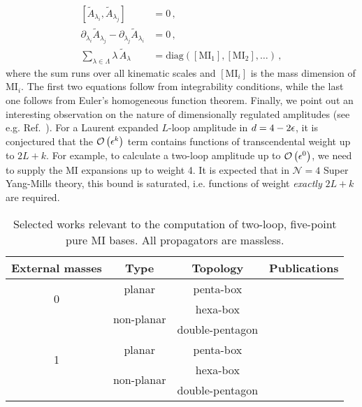 \documentclass[main.tex]{subfiles}
\begin{document}
\begin{subequations}
\begin{align}
    [ \tilde{A}_{\lambda_i}, \tilde{A}_{\lambda_j}] &= 0\,, \\
    \partial_{\lambda_i} \tilde{A}_{\lambda_j} - \partial_{\lambda_j} \tilde{A}_{\lambda_i} &= 0\,, \\
    \sum_{\lambda \in \Lambda} \lambda \, \tilde{A}_\lambda &= \text{diag}([\text{MI}_1], [\text{MI}_2], \ldots)\,,
\end{align}
\end{subequations}
where the sum runs over all kinematic scales and $[\text{MI}_i]$ is the mass dimension of MI$_i$. The first two equations follow from integrability conditions, while the last one follows from Euler's homogeneous function theorem. Finally, we point out an interesting observation on the nature of dimensionally regulated amplitudes (see e.g. Ref.~\cite{Duhr:2014woa}). For a Laurent expanded $L$-loop amplitude in $d = 4- 2\epsilon$, it is conjectured that the $\mathcal{O}\left(\epsilon^k\right)$ term contains functions of transcendental weight up to $2L+k$. For example, to calculate a two-loop amplitude up to $\mathcal{O}\left(\epsilon^0\right)$, we need to supply the MI expansions up to weight 4. It is expected that in $\mathcal{N}=4$ Super Yang-Mills theory, this bound is saturated, i.e. functions of weight \textit{exactly} $2L+k$ are required.
\begin{table}[t]
	\begin{center}
		\begin{tabular}{|c|c|c|c|}
            \hline
            External masses & Type & Topology & Publications \\
			\hline
            \multirow{2}{0cm}{0} & planar & penta-box & \cite{Gehrmann:2015bfy,Papadopoulos:2015jft, Gehrmann:2018yef, Abreu:2018aqd, Chicherin:2020oor} \\
            \cline{2-4}
            & \multirow{2}{2cm}{non-planar} & hexa-box & \cite{Chicherin:2018mue, Chicherin:2017dob, Chicherin:2018ubl, Chicherin:2018wes, Abreu:2018rcw, Chicherin:2020oor, Abreu:2018aqd} \\
            & & double-pentagon & \cite{Chicherin:2018old, Abreu:2018aqd, Chicherin:2020oor} \\
            \hline
            \multirow{2}{0cm}{1} & planar & penta-box & \cite{Papadopoulos:2015jft, Abreu:2020jxa, Chicherin:2021dyp, Canko:2020ylt} \\
            \cline{2-4}
            & \multirow{2}{2cm}{non-planar} & hexa-box & \cite{abreu2021twoloop, Kardos:2022tpo, Papadopoulos:2019iam, Chicherin:2021dyp} \\
            & & double-pentagon & \cite{Abreu:2023rco} \\
            \hline
		\end{tabular}
\end{center}
\caption{Selected works relevant to the computation of two-loop, five-point pure MI bases. All propagators are massless.}
\label{tab:MIs}
\end{table}
\end{document}

